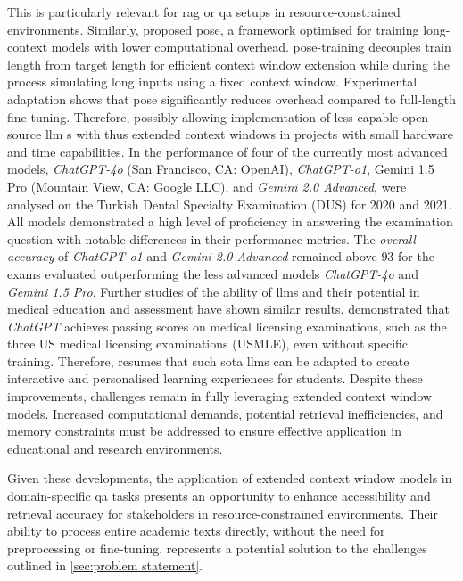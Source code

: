 This is particularly relevant for \ac{rag} or \ac{qa} setups in resource-constrained environments.
%
Similarly, \citet{zhu2024poseefficientcontextwindow} proposed \ac{pose}, a framework optimised for training long-context models with lower computational overhead. 
\ac{pose}-training decouples train length from target length for efficient context window extension while during the process simulating long inputs using a fixed context window.
Experimental adaptation shows that \ac{pose} significantly reduces overhead compared to full-length fine-tuning\citep{zhu2024poseefficientcontextwindow}.
Therefore, possibly allowing implementation of less capable open-source \ac{llm} s with thus extended context windows in projects with small hardware and time capabilities.
In \citet{kinikogluI2025} the performance of four of the currently most advanced models, \textit{ChatGPT-4o} (San Francisco, CA: OpenAI), \textit{ChatGPT-o1}, Gemini 1.5 Pro (Mountain View, CA: Google LLC), and \textit{Gemini 2.0 Advanced}, were analysed on the Turkish Dental Specialty Examination (DUS) for 2020 and 2021.
All models demonstrated a high level of proficiency in answering the examination question with notable differences in their performance metrics.
%
The \textit{overall accuracy} of \textit{ChatGPT-o1} and \textit{Gemini 2.0 Advanced} remained above $93$ for the exams evaluated outperforming the less advanced models \textit{ChatGPT-4o} and \textit{Gemini 1.5 Pro}.
Further studies of the ability of \ac{llm}s and their potential in medical education and assessment have shown similar results.
%
\citet{USMLE2023, chatgptUSMLE2023} demonstrated that \textit{ChatGPT} achieves passing scores on medical licensing examinations, such as the three US medical licensing examinations (USMLE), even without specific training. 
Therefore, \citet{kinikogluI2025} resumes that such \ac{sota} \ac{llm}s can be adapted to create interactive and personalised learning experiences for students.
%
Despite these improvements, challenges remain in fully leveraging extended context window models. 
Increased computational demands, potential retrieval inefficiencies, and memory constraints must be addressed to ensure effective application in educational and research environments. 

Given these developments, the application of extended context window models in domain-specific \ac{qa} tasks presents an opportunity to enhance accessibility and retrieval accuracy for stakeholders in resource-constrained environments.
Their ability to process entire academic texts directly, without the need for preprocessing or fine-tuning, represents a potential solution to the challenges outlined in \cref{sec:problem statement}.

